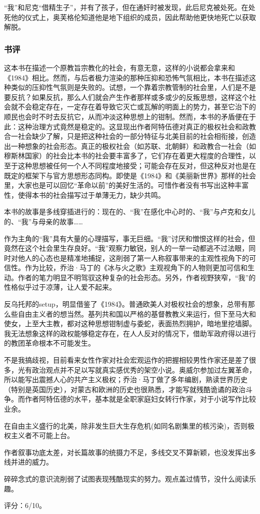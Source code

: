 “我”和尼克“借精生子”，并有了孩子，但在通奸时被发现，此后尼克被处死。在处死他的仪式上，奥芙格伦知道他是地下组织的成员，因此帮助他更快地死亡以获取解脱。

\subsubsection{书评}
这本书在描述一个原教旨宗教化的社会，有意无意，这样的小说都会拿来和《1984》相比。然而，与后者极力渲染的那种压抑和恐怖气氛相比，本书在描述这种类似的压抑性气氛则是失败的。试想，一个靠着宗教管制的社会里，人们是不是要反抗？如果反抗，那么人们就会产生作者那样或多或少的反叛思想，这样这个社会就不会稳定存在，一定存在着导致它灭亡或瓦解的明面上的势力，甚至它治下的顺民也会时不时去反抗它，从而冲淡这种思想上的钳制。然而，本书的矛盾便在于此：这种治理方式竟然是稳定的。这显现出作者阿特伍德对真正的极权社会和政教合一社会缺少了解，只是把这种社会的一部分特征与北美目前的社会相衔接，创造出一种想象的社会形态。真正的极权社会（如苏联、北朝鲜）和政教合一社会（如穆斯林国家）的社会比本书的社会要丰富多了，它们存在着更大程度的合理性，以至于这种思想被任何一个人不同程度地接受；可能会存在反对，但这种反对也是在既定的框架下与官方思想形态同构。即使是《1984》和《美丽新世界》那样的社会里，大家也是可以回忆“革命以前”的美好生活的。可惜作者没有书写出这种丰富性，使得本书的社会描写过于单薄无力，缺少共鸣。

本书的故事是多线穿插进行的：现在的、“我”在感化中心时的、“我”与卢克和女儿的、“我”与母亲的故事……

作为主角的“我”具有大量的心理描写，事无巨细。“我”讨厌和憎恨这样的社会，但竟然在这个社会里生存良好。“我”观察力敏锐，别人的一举一动都逃不过法眼，同时对他人的心态也是精准地捕捉，这削弱了第一人称叙事带来的主观性视角下的可信性。作为比较，乔治·马丁的《冰与火之歌》主观视角下的人物则更加可信和生动。作者的笔力明显不明驾驭这种复杂的社会形态。另外，作者视野狭窄，“我”的性格似乎过于凉薄，让人爱不起来。

反乌托邦的setup，明显借鉴了《1984》。普通欧美人对极权社会的想象，总带有那么些自由主义者的想当然。基列共和国以严格的基督教教义来运行，但下至马大和使女，上至大主教，都对这种思想钳制虚与委蛇，表面热烈拥护，暗地里挖墙脚。我无法想象这样的政权能够稳定存在，在人人反对的情况下，借助军政府得以进行的教团革命根本不可能发生。

不是我搞歧视，目前看来女性作家对社会宏观运作的把握相较男性作家还是差了很多，光有政治观点并不足以写就真实感优秀的架空小说。奥威尔参加过左翼革命，所以能写出震撼人心的共产主义极权；乔治·马丁做了多年编剧，熟读世界历史（特别是英国历史），对蒙古和欧洲的历史也很熟悉，才能写就残酷诡谲的政治斗争。而作者阿特伍德的水平，基本就是全职家庭妇女转行作家，对于小说写作比较业余。

在自由主义盛行的北美，除非发生巨大生存危机(如同名剧集里的核污染)，否则极权主义者不可能上台。

作者叙事功底太差，对长篇故事的统摄力不足，多线交叉不算新颖，也没发挥出多线并进的威力。

碎碎念式的意识流削弱了试图表现残酷现实的努力。观点盖过情节，没什么阅读乐趣。

评分：6/10。
